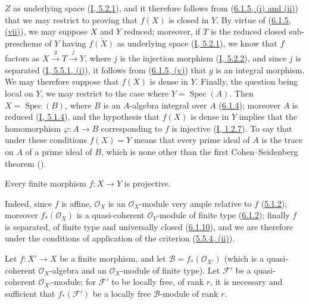 $Z$ as underlying space (\hyperref[I.5.2.1]{I, 5.2.1}), and it therefore
follows from (\hyperref[II.6.1.5]{6.1.5, (i) and (ii)}) that we may
restrict to proving that $f(X)$ is closed in $Y$. By virtue of
(\hyperref[II.6.1.5]{6.1.5, (vii)}), we may suppose $X$ and $Y$ reduced;
moreover, if $T$ is the reduced closed sub-prescheme of $Y$ having
$\overline{f(X)}$ as underlying space (\hyperref[I.5.2.1]{I, 5.2.1}), we
know that $f$ factors as $X\xrightarrow{g}T\xrightarrow{j}Y$, where $j$ is
the injection morphism (\hyperref[I.5.2.2]{I, 5.2.2}), and since $j$ is
separated (\hyperref[I.5.5.1]{I, 5.5.1, (i)}), it follows from
(\hyperref[II.6.1.5]{6.1.5, (v)}) that $g$ is an integral morphism. We may
therefore suppose that $f(X)$ is dense in $Y$. Finally, the question being
local on $Y$, we may restrict to the case where $Y=\operatorname{Spec}(A)$.
Then $X=\operatorname{Spec}(B)$, where $B$ is an $A$-algebra integral over
$A$ (\hyperref[II.6.1.4]{6.1.4}); moreover $A$ is reduced
(\hyperref[I.5.1.4]{I, 5.1.4}), and the hypothesis that $f(X)$ is dense in
$Y$ implies that the homomorphism $\varphi:A\to B$ corresponding to $f$ is
injective (\hyperref[I.1.2.7]{I, 1.2.7}). To say that under these
conditions $f(X)=Y$ means that every prime ideal of $A$ is the trace on $A$
of a prime ideal of $B$, which is none other than the first
Cohen--Seidenberg theorem (\cite[vol.~I, p.~257, Theorem~3]{I-13}).

\begin{corollary}[6.1.11]
\label{II.6.1.11}
Every finite morphism $f:X\to Y$ is projective.
\end{corollary}

Indeed, since $f$ is affine, $\mathcal{O}_X$ is an $\mathcal{O}_X$-module
very ample relative to $f$ (\hyperref[II.5.1.2]{5.1.2}); moreover
$f_*(\mathcal{O}_X)$ is a quasi-coherent $\mathcal{O}_Y$-module of finite
type (\hyperref[II.6.1.2]{6.1.2}); finally $f$ is separated, of finite
type and universally closed (\hyperref[II.6.1.10]{6.1.10}), and we are
therefore under the conditions of application of the criterion
(\hyperref[II.5.5.4]{5.5.4, (ii)}).

\begin{proposition}[6.1.12]
\label{II.6.1.12}
Let $f:X'\to X$ be a finite morphism, and let
$\mathcal{B}=f_*(\mathcal{O}_{X'})$ (which is a quasi-coherent
$\mathcal{O}_X$-algebra and an $\mathcal{O}_X$-module of finite type). Let
$\mathcal{F}'$ be a quasi-coherent $\mathcal{O}_{X'}$-module; for
$\mathcal{F}'$ to be locally free, of rank $r$, it is necessary and
sufficient that $f_*(\mathcal{F}')$ be a locally free $\mathcal{B}$-module of
rank $r$.
\end{proposition}

